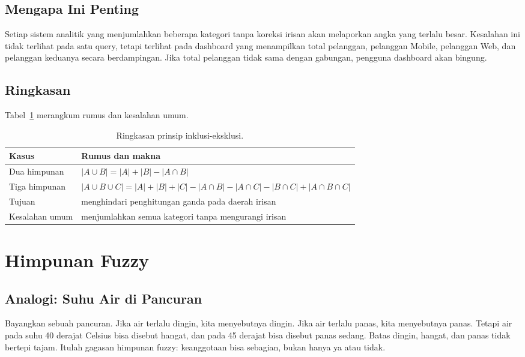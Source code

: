 \documentclass[11pt,a4paper]{article}
\begin{document}
\subsection{Mengapa Ini Penting}

Setiap sistem analitik yang menjumlahkan beberapa kategori tanpa koreksi irisan akan melaporkan angka yang terlalu besar. Kesalahan ini tidak terlihat pada satu query, tetapi terlihat pada dashboard yang menampilkan total pelanggan, pelanggan Mobile, pelanggan Web, dan pelanggan keduanya secara berdampingan. Jika total pelanggan tidak sama dengan gabungan, pengguna dashboard akan bingung.

\subsection{Ringkasan}

Tabel~\ref{tab:inklusi} merangkum rumus dan kesalahan umum.

\begin{table}[H]
	\centering
	\caption{Ringkasan prinsip inklusi-eksklusi.}
	\label{tab:inklusi}
	\small
	\begin{tabularx}{\textwidth}{l X}
		\toprule
		Kasus & Rumus dan makna \\
		\midrule
		Dua himpunan & $|A \cup B|=|A|+|B|-|A \cap B|$ \\
		Tiga himpunan & $|A \cup B \cup C|=|A|+|B|+|C|-|A \cap B|-|A \cap C|-|B \cap C|+|A \cap B \cap C|$ \\
		Tujuan & menghindari penghitungan ganda pada daerah irisan \\
		Kesalahan umum & menjumlahkan semua kategori tanpa mengurangi irisan \\
		\bottomrule
	\end{tabularx}
\end{table}

\section{Himpunan Fuzzy}

\subsection{Analogi: Suhu Air di Pancuran}

Bayangkan sebuah pancuran. Jika air terlalu dingin, kita menyebutnya dingin. Jika air terlalu panas, kita menyebutnya panas. Tetapi air pada suhu 40 derajat Celsius bisa disebut hangat, dan pada 45 derajat bisa disebut panas sedang. Batas dingin, hangat, dan panas tidak bertepi tajam. Itulah gagasan himpunan fuzzy: keanggotaan bisa sebagian, bukan hanya ya atau tidak.
\end{document}
